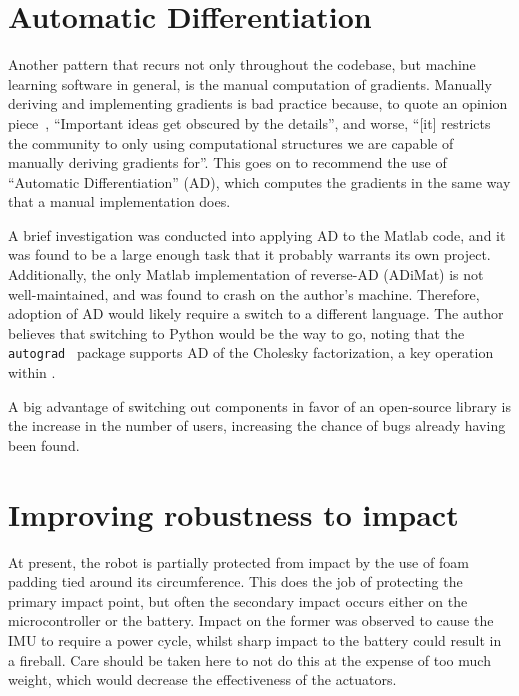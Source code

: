 \documentclass[main.tex]{subfiles}
\begin{document}
\section{Automatic Differentiation}

	Another pattern that recurs not only throughout the {\Pilco} codebase, but machine learning software in general, is the manual computation of gradients.
	Manually deriving and implementing gradients is bad practice because, to quote an opinion piece~\cite{ad-criminal}, \enquote{Important ideas get obscured by the details}, and worse, \enquote{[it] restricts the community to only using computational structures we are capable of manually deriving gradients for}.
	This goes on to recommend the use of \enquote{Automatic Differentiation} (AD), which computes the gradients in the same way that a manual implementation does.

	A brief investigation was conducted into applying AD to the Matlab {\Pilco} code, and it was found to be a large enough task that it probably warrants its own project. Additionally, the only Matlab implementation of reverse-AD (ADiMat) is not well-maintained, and was found to crash on the author's machine.
	Therefore, adoption of AD would likely require a switch to a different language.
	The author believes that switching to Python would be the way to go\footnotemark, noting that the \texttt{autograd}~\cite{autograd} package supports AD of the Cholesky factorization, a key operation within {\Pilco}.

	A big advantage of switching out components in favor of an open-source library is the increase in the number of users, increasing the chance of bugs already having been found.


\section{Improving robustness to impact}

	At present, the robot is partially protected from impact by the use of foam padding tied around its circumference.
	This does the job of protecting the primary impact point, but often the secondary impact occurs either on the microcontroller or the battery. Impact on the former was observed to cause the IMU to require a power cycle, whilst sharp impact to the battery could result in a fireball.
	Care should be taken here to not do this at the expense of too much weight, which would decrease the effectiveness of the actuators. 
\end{document}
